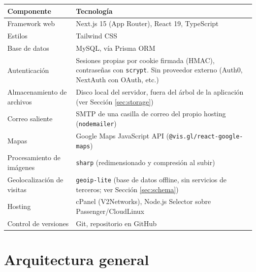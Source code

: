 \documentclass[11pt,a4paper]{article}
\begin{document}
\begin{longtable}{p{4cm}p{10cm}}
\toprule
\textbf{Componente} & \textbf{Tecnología} \\
\midrule
\endhead
Framework web & Next.js 15 (App Router), React 19, TypeScript \\
Estilos & Tailwind CSS \\
Base de datos & MySQL, vía Prisma ORM \\
Autenticación & Sesiones propias por cookie firmada (HMAC), contraseñas con \texttt{scrypt}. Sin proveedor externo (Auth0, NextAuth con OAuth, etc.) \\
Almacenamiento de archivos & Disco local del servidor, fuera del árbol de la aplicación (ver Sección \ref{sec:storage}) \\
Correo saliente & SMTP de una casilla de correo del propio hosting (\texttt{nodemailer}) \\
Mapas & Google Maps JavaScript API (\texttt{@vis.gl/react-google-maps}) \\
Procesamiento de imágenes & \texttt{sharp} (redimensionado y compresión al subir) \\
Geolocalización de visitas & \texttt{geoip-lite} (base de datos offline, sin servicios de terceros; ver Sección \ref{sec:schema}) \\
Hosting & cPanel (V2Networks), Node.js Selector sobre Passenger/CloudLinux \\
Control de versiones & Git, repositorio en GitHub \\
\bottomrule
\end{longtable}

\section{Arquitectura general}
\end{document}
